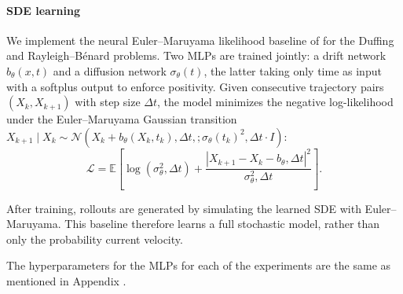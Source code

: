 \documentclass[oneside,11pt]{article}
\theoremstyle{remark}
\begin{document}
\paragraph{SDE learning}
  We implement the neural Euler--Maruyama likelihood baseline of \cite{dridi2021learning} for the Duffing and Rayleigh--B\'enard      problems.                                                                                                                 
  Two MLPs are trained jointly: a drift network $b_\theta(x, t)$ and a diffusion network $\sigma_\theta(t)$, the latter     
  taking only time as input with a softplus output to enforce positivity.                                                   
  Given consecutive trajectory pairs $(X_k, X_{k+1})$ with step size $\Delta t$, the model minimizes the negative           
  log-likelihood under the Euler--Maruyama Gaussian transition $X_{k+1} \mid X_k \sim \mathcal{N}(X_k + b_\theta(X_k,
  t_k),\Delta t,; \sigma_\theta(t_k)^2,\Delta t\cdot I)$:                                                                   
  $$\mathcal{L} = \mathbb{E}\left[\log\left(\sigma_\theta^2,\Delta t\right) + \frac{|X_{k+1} - X_k - b_\theta,\Delta
  t|^2}{\sigma_\theta^2,\Delta t}\right].$$                                                                                 














































After training, rollouts are generated by simulating the learned SDE with Euler--Maruyama.  This baseline therefore learns a full stochastic model, rather than only the probability current velocity.

The hyperparameters for the MLPs for each of the experiments are the same as mentioned in Appendix .
\end{document}
